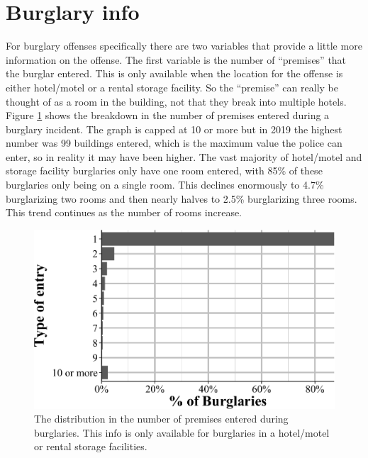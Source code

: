 \documentclass[
  12pt,
  openany]{book}
\begin{document}
\section{Burglary info}\label{burglary-info}

For burglary offenses specifically there are two variables that provide a little more information on the offense. The first variable is the number of ``premises'' that the burglar entered. This is only available when the location for the offense is either hotel/motel or a rental storage facility. So the ``premise'' can really be thought of as a room in the building, not that they break into multiple hotels. Figure \ref{fig:offensePremisesEntered} shows the breakdown in the number of premises entered during a burglary incident. The graph is capped at 10 or more but in 2019 the highest number was 99 buildings entered, which is the maximum value the police can enter, so in reality it may have been higher. The vast majority of hotel/motel and storage facility burglaries only have one room entered, with 85\% of these burglaries only being on a single room. This declines enormously to 4.7\% burglarizing two rooms and then nearly halves to 2.5\% burglarizing three rooms. This trend continues as the number of rooms increase.

\begin{figure}

{\centering \includegraphics[width=0.9\linewidth]{13_nibrs_offense_files/figure-latex/offensePremisesEntered-1} 

}

\caption{The distribution in the number of premises entered during burglaries. This info is only available for burglaries in a hotel/motel or rental storage facilities.}\label{fig:offensePremisesEntered}
\end{figure}
\end{document}
